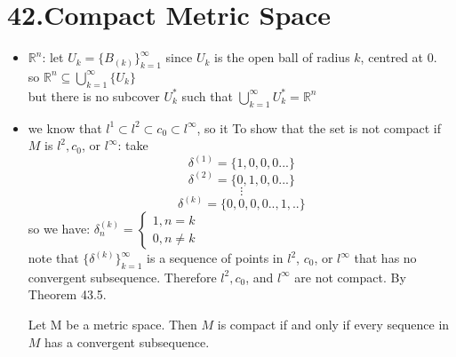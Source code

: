 \documentclass{book}
\begin{document}
\section{42.Compact Metric Space}
\begin{tcolorbox}[enhanced,attach boxed title to top center={yshift=-3mm,yshifttext=-1mm},
colback=blue!5!white,colframe=blue!75!black,colbacktitle=red!80!black,
title=Exercise 42.1:,fonttitle=\bfseries,
boxed title style={size=small,colframe=red!50!black} ]
\begin{itemize}
\item {\color{red}$\mathbb{R}^n$}:
let $U_k=\{B_{(k)}\}_{k=1}^{\infty}$ since $U_k$ is the open ball of radius $k$, centred at $0$.\\
so $\mathbb{R}^n\subseteq\bigcup_{k=1}^{\infty}\{U_k\}$\\
but there is no subcover $U_{k}^{*}$ such that $\bigcup_{k=1}^{\infty}U_{k}^{*}=\mathbb{R}^n$
\item we know that $l^1\subset l^2\subset c_0\subset l^\infty$, so it 
To show that the set is not compact if $M$ is $l^2,c_0$, or $l^\infty$:
take $$\delta^{(1)}=\{1,0,0,0...\}$$
$$\delta^{(2)}=\{0,1,0,0...\}$$
$$\vdots$$
$$\delta^{(k)}=\{0,0,0,0..,1,..\}$$
so we have: $\delta^{(k)}_n=
\begin{cases} 
1 ,n=k\\
0 ,n\neq k 
\end{cases}$\\
note that $\{\delta^{(k)}\}^{\infty}_{k=1}$ is a sequence of points in $l^2$, $c_0$, or $l^\infty$ that has 
no convergent subsequence.
Therefore $l^2, c_0$, and $l^\infty$ are not compact. By Theorem 43.5.
\begin{tcolorbox}[colback=red!5!white,colframe=red!75!black]
Let M be a metric space. Then $M$ is compact if and only if every sequence in $M$ has a convergent subsequence.
\end{tcolorbox}
\end{itemize}
\end{tcolorbox}
\end{document}
